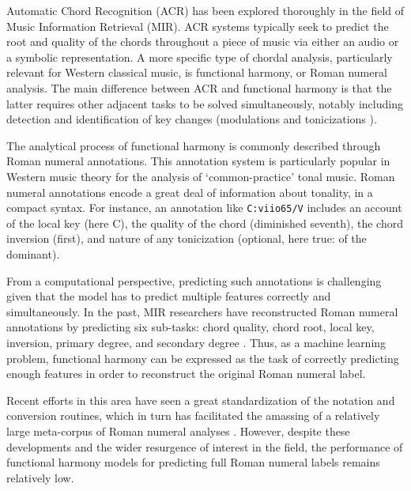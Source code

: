 Automatic Chord Recognition (ACR) has been explored thoroughly in the field of Music Information Retrieval (MIR). 
ACR systems typically seek to predict the root and quality of the chords throughout a piece of music via either an audio or a symbolic representation.
A more specific type of chordal analysis, particularly relevant for Western classical music, is functional harmony, or Roman numeral analysis. 
The main difference between ACR and functional harmony is that the latter requires other adjacent tasks to be solved simultaneously, notably including detection and identification of key changes (modulations \cite{feisthauer_estimating_2020, schreiber_local_2020} and tonicizations \cite{napoles_lopez_local_2020}).


The analytical process of functional harmony is commonly described through Roman numeral annotations. 
This annotation system is particularly popular in Western music theory for the analysis of `common-practice' tonal music.
Roman numeral annotations encode a great deal of information about tonality, in a compact syntax.
For instance, an annotation like  \texttt{C:viio65/V} includes an account of the local key (here C), the quality of the chord (diminished seventh), the chord inversion (first), and nature of any tonicization (optional, here true: of the dominant). 

From a computational perspective, predicting such annotations is challenging given that the model has to predict multiple features correctly and simultaneously. 
In the past, MIR researchers have reconstructed Roman numeral annotations by predicting six sub-tasks: chord quality, chord root, local key, inversion, primary degree, and secondary degree \cite{chen_functional_2018, micchi_not_2020}. 
%
Thus, as a machine learning problem, functional harmony can be expressed as the task of correctly predicting enough features in order to reconstruct the original Roman numeral label. 


Recent efforts in this area have seen a great standardization of the notation and conversion routines, \cite{gotham_romantext_2019} which in turn has facilitated the amassing of a relatively large meta-corpus of Roman numeral analyses \cite{gotham_romantext_2019}.
However, despite these developments and the wider resurgence of interest in the field, the performance of functional harmony models for predicting full Roman numeral labels remains relatively low.

